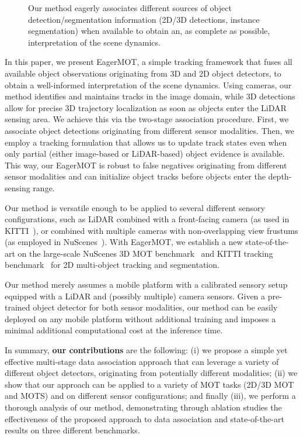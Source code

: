 \documentclass[letterpaper, 10 pt, conference]{ieeeconf}
\begin{document}
\begin{figure}[ht]
\setlength{\fboxsep}{0.3pt}\begin{center}
\end{center}
\label{fig:qualitative}
\vspace{-7pt}
\caption{Our method eagerly associates different sources of object detection/segmentation information (2D/3D detections, instance segmentation) when available to obtain an, as complete as possible, interpretation of the scene dynamics.}
\end{figure}


In this paper, we present EagerMOT, a simple tracking framework that fuses all available object observations originating from 3D and 2D object detectors, to obtain a well-informed interpretation of the scene dynamics. 
Using cameras, our method identifies and maintains tracks in the image domain, while 3D detections allow for precise 3D trajectory localization as soon as objects enter the LiDAR sensing area. We achieve this via the two-stage association procedure. First, we associate object detections originating from different sensor modalities. Then, we employ a tracking formulation that allows us to update track states even when only partial (either image-based or LiDAR-based) object evidence is available. This way, our EagerMOT is robust to false negatives originating from different sensor modalities and can initialize object tracks before objects enter the depth-sensing range. 


Our method is versatile enough to be applied to several different sensory configurations, such as LiDAR combined with a front-facing camera (as used in KITTI~\cite{Geiger12CVPR}), or combined with multiple cameras with non-overlapping view frustums (as employed in NuScenes~\cite{nuscenes2019}). 
With EagerMOT, we establish a new state-of-the-art on the large-scale NuScenes 3D MOT benchmark~\cite{nuscenes2019} and KITTI tracking benchmark~\cite{Geiger12CVPR} for 2D multi-object tracking and segmentation. 


Our method merely assumes a mobile platform with a calibrated sensory setup equipped with a LiDAR and (possibly multiple) camera sensors. Given a pre-trained object detector for both sensor modalities, our method can be easily deployed on any mobile platform without additional training and imposes a minimal additional computational cost at the inference time. 

In summary, \textbf{our contributions} are the following: (i) we propose a simple yet effective multi-stage data association approach that can leverage a variety of different object detectors, originating from potentially different modalities; (ii) we show that our approach can be applied to a variety of MOT tasks (2D/3D MOT and MOTS) and on different sensor configurations; and finally (iii), we perform a thorough analysis of our method, demonstrating through ablation studies the effectiveness of the proposed approach to data association and state-of-the-art results on three different benchmarks. 
\end{document}
